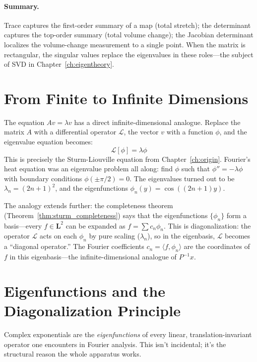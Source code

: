 \documentclass[12pt,a4paper]{report}
\theoremstyle{thms}
\theoremstyle{defns}
\begin{document}
\paragraph{Summary.} Trace captures the first-order summary of a map (total stretch); the determinant captures the top-order summary (total volume change); the Jacobian determinant localizes the volume-change measurement to a single point. When the matrix is rectangular, the singular values replace the eigenvalues in these roles—the subject of SVD in Chapter~\ref{ch:eigentheory}.

\section{From Finite to Infinite Dimensions}
\label{sec:finite_to_infinite}

The equation $Av = \lambda v$ has a direct infinite-dimensional analogue. Replace the matrix $A$ with a differential operator $\mathcal{L}$, the vector $v$ with a function $\phi$, and the eigenvalue equation becomes:
\begin{equation}
    \mathcal{L}[\phi] = \lambda\phi
\end{equation}
This is precisely the Sturm-Liouville equation from Chapter~\ref{ch:origin}. Fourier's heat equation was an eigenvalue problem all along: find $\phi$ such that $\phi'' = -\lambda\phi$ with boundary conditions $\phi(\pm\pi/2) = 0$. The eigenvalues turned out to be $\lambda_n = (2n+1)^2$, and the eigenfunctions $\phi_n(y) = \cos((2n+1)y)$.

The analogy extends further: the completeness theorem (Theorem~\ref{thm:sturm_completeness}) says that the eigenfunctions $\{\phi_n\}$ form a basis—every $f \in \mathbf{L}^2$ can be expanded as $f = \sum c_n \phi_n$. This is diagonalization: the operator $\mathcal{L}$ acts on each $\phi_n$ by pure scaling ($\lambda_n$), so in the eigenbasis, $\mathcal{L}$ becomes a ``diagonal operator.'' The Fourier coefficients $c_n = \langle f, \phi_n \rangle$ are the coordinates of $f$ in this eigenbasis—the infinite-dimensional analogue of $P^{-1}x$.

\section{Eigenfunctions and the Diagonalization Principle}
\label{sec:eigenfunctions}

Complex exponentials are the \textit{eigenfunctions} of every linear, translation-invariant operator one encounters in Fourier analysis. This isn't incidental; it's the structural reason the whole apparatus works.
\end{document}
